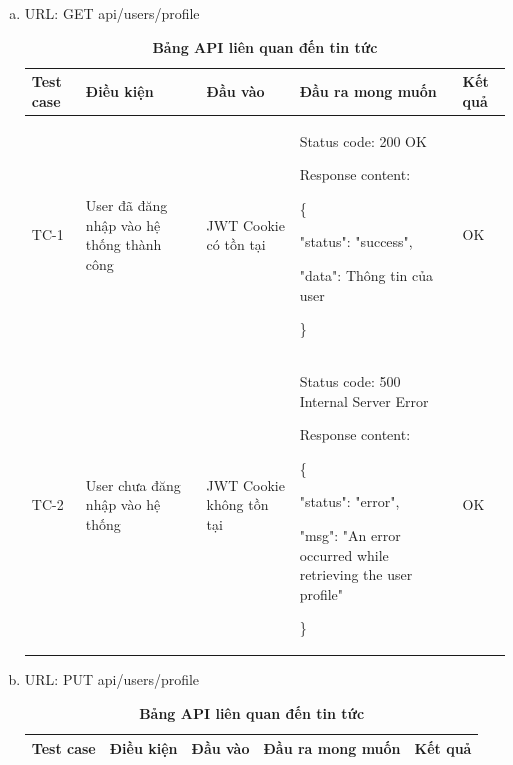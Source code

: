 \begin{enumerate}[a)]
  \item URL: GET api/users/profile 
  
  \begin{table}[H]
    \centering
    \caption{\bfseries \fontsize{12pt}{0pt}\selectfont Bảng API liên quan đến tin tức}
    \begin{tabularx}{\textwidth}{
    | >{\raggedright\arraybackslash}m{1cm}
    | >{\raggedright\arraybackslash}X
    | >{\raggedright\arraybackslash}X
    | >{\raggedright\arraybackslash}X
    | >{\raggedright\arraybackslash}m{1cm}|
    }
    \hline
    \bfseries Test case    &\bfseries Điều kiện   &\bfseries Đầu vào 
    &\bfseries Đầu ra mong muốn &\bfseries Kết quả\\ \hline


    TC-1
    & User đã đăng nhập vào hệ thống thành công
    & JWT Cookie có tồn tại
    & 

    Status code: 200 OK

      Response content:

      \{

    "status": "success",

    "data": Thông tin của user

    \}
    
    & OK

    \\ \hline
  
    TC-2
    & User chưa đăng nhập vào hệ thống
    & JWT Cookie không tồn tại
    & 

    Status code: 500 Internal Server Error

      Response content:

      \{

    "status": "error",

    "msg": "An error occurred while retrieving the user profile"

    \}
    
    & OK

    \\ \hline
  
    \end{tabularx}
    \label{table_api_news}
  \end{table}
  

  \item URL: PUT api/users/profile
  
  \begin{table}[H]
    \centering
    \caption{\bfseries \fontsize{12pt}{0pt}\selectfont Bảng API liên quan đến tin tức}
    \begin{tabularx}{\textwidth}{
    | >{\raggedright\arraybackslash}m{1cm}
    | >{\raggedright\arraybackslash}X
    | >{\raggedright\arraybackslash}X
    | >{\raggedright\arraybackslash}X
    | >{\raggedright\arraybackslash}m{1cm}|
    }
    \hline
    \bfseries Test case    &\bfseries Điều kiện   &\bfseries Đầu vào 
    &\bfseries Đầu ra mong muốn &\bfseries Kết quả\\ \hline



\end{tabularx}
\end{table}
\end{enumerate}
